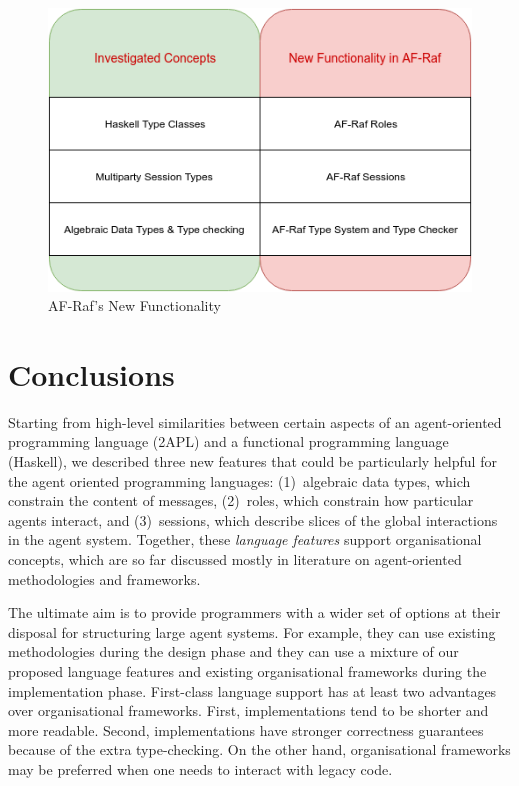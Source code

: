 \documentclass[a4paper,12pt,oneside,fleqn]{book} %
\newcommand{\todo}[1]{[\textcolor{red}{TODO}: #1]}
\begin{document}
{\begin{figure}\footnotesize %
\includegraphics{NewFunctionality.png}
\caption{AF-Raf's New Functionality}
\label{fig:newFunct}
\end{figure} %



\chapter{Conclusions}\label{ch:conc} %


Starting from high-level similarities between certain aspects of an
agent-oriented programming language (2APL) and a functional programming
language (Haskell), we described three new features that could be
particularly helpful for the agent oriented programming languages:
(1)~algebraic data types, which constrain the content of messages,
(2)~roles, which constrain how particular agents interact, and
(3)~sessions, which describe slices of the global interactions in the agent
system. Together, these \emph{language features} support organisational
concepts, which are so far discussed mostly in literature on
agent-oriented methodologies and frameworks.

The ultimate aim is to provide programmers with a wider set of options at
their disposal for structuring large agent systems. For example, they can
use existing methodologies during the design phase and they can use a
mixture of our proposed language features and existing organisational
frameworks during the implementation phase. First-class language support
has at least two advantages over organisational frameworks. First,
implementations tend to be shorter and more readable. Second,
implementations have stronger correctness guarantees because of the extra
type-checking. On the other hand, organisational frameworks may be
preferred when one needs to interact with legacy code.

}
\end{document}
